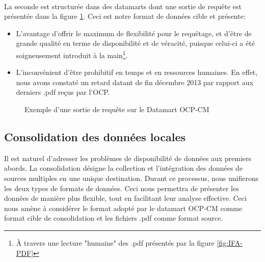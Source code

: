 		\paragraph{}
		La seconde est structurée dans des datamarts dont une sortie de requête est présentée dans la figure \ref{fig:DMOCP}.
	Ceci est notre format de données cible 
	et présente:
	\begin{itemize}
	\item L'avantage d’offrir le maximum de flexibilité pour le requêtage, et d'être de grande qualité en terme de disponibilité et de véracité, puisque celui-ci a été soigneusement introduit à la main\footnote{À travers une lecture "humaine" des .pdf présentés par la figure \ref{fig:IFA-PDF}}.
	\item L’inconvénient d'être prohibitif en temps et en ressources humaines.
	 En effet, nous avons constaté un retard datant de fin décembre 2013 par rapport aux derniers .pdf reçus par l'OCP.
	\end{itemize}
	\begin{figure}[H]
		    		\centering
		    		\caption{Exemple d'une sortie de requête sur le Datamart OCP-CM}
		    		\label{fig:DMOCP}
	\end{figure}
	\subsection{Consolidation des données locales}
	Il est naturel d'adresser les problèmes de disponibilité de données aux premiers abords. La consolidation désigne la collection et l'intégration des données de sources multiples en une unique destination. Durant ce processus, nous unifierons les deux types de formats de données. Ceci nous permettra de présenter les données de manière plus flexible, tout en facilitant leur analyse effective. Ceci nous amène à considérer le format adopté par le datamart OCP-CM comme format cible de consolidation et les fichiers .pdf comme format source.
